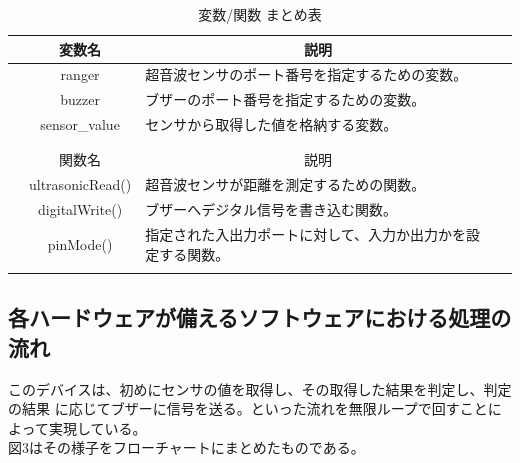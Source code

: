 \documentclass[dvipdfmx,autodetect-engine,titlepage]{jsarticle}
\begin{document}
  \begin{table}[h]
    \centering
    \caption{変数/関数 まとめ表}
    \begin{tabular}{ccll}
    \hline
                         & 変数名                                  & \multicolumn{1}{c}{説明}         &  \\ \hline
                         & ranger                               & 超音波センサのポート番号を指定するための変数。        &  \\ \hline
                         & buzzer                               & ブザーのポート番号を指定するための変数。           &  \\ \hline
                         & sensor\_value                        & センサから取得した値を格納する変数。             &  \\ \hline
    \multicolumn{1}{l}{} & \multicolumn{1}{l}{}                 &                                &  \\
                         &                                      & \multicolumn{1}{c}{}           &  \\ \hline
                         & 関数名                                  & \multicolumn{1}{c}{説明}         &  \\ \hline
    \multicolumn{1}{l}{} & \multicolumn{1}{l}{ultrasonicRead()} & 超音波センサが距離を測定するための関数。           &  \\ \hline
                         & digitalWrite()                       & ブザーへデジタル信号を書き込む関数。             &  \\ \hline
                         & pinMode()                            & 指定された入出力ポートに対して、入力か出力かを設定する関数。 &  \\ \hline
    \multicolumn{1}{l}{} & \multicolumn{1}{l}{}                 &                                & 
    \end{tabular}
    \end{table}

  \subsection{各ハードウェアが備えるソフトウェアにおける処理の流れ}
  このデバイスは、初めにセンサの値を取得し、その取得した結果を判定し、判定の結果
  に応じてブザーに信号を送る。といった流れを無限ループで回すことによって実現している。\\
  図3はその様子をフローチャートにまとめたものである。
\end{document}
